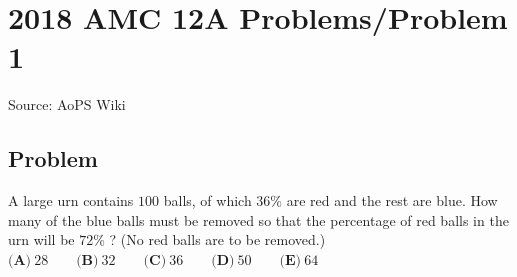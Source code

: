 \documentclass[12pt]{article}
\begin{document}
\section*{{2018 AMC 12A Problems/Problem 1}}
Source: AoPS Wiki

\subsection*{Problem}
A large urn contains $100$ balls, of which $36 \%$ are red and the rest are blue. How many of the blue balls must be removed so that the percentage of red balls in the urn will be $72 \%$ ? (No red balls are to be removed.) $\textbf{(A)}\ 28 \qquad\textbf{(B)}\ 32 \qquad\textbf{(C)}\ 36 \qquad\textbf{(D)}\ 50 \qquad\textbf{(E)}\ 64$
\end{document}

